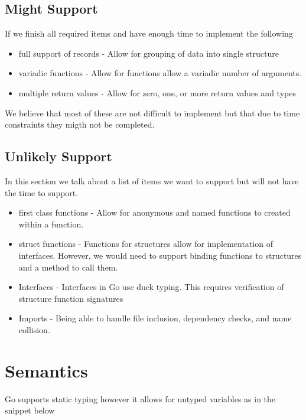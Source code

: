 \documentclass{article}
\begin{document}
\subsection{Might Support}

If we finish all required items and have enough time to implement the following 

\begin{itemize}
    \item full support of records   - Allow for grouping of data into single structure
    \item variadic functions        - Allow for functions allow a variadic number of arguments.
    \item multiple return values    - Allow for zero, one, or more return values and types
\end{itemize}
 
We believe that most of these are not difficult to implement but that due to time constraints they migth not be completed.

\subsection{Unlikely Support} 

In this section we talk about a list of items we want to support but will not have the time to support.

\begin{itemize}
    \item first class functions     - Allow for anonymous and named functions to created within a function.
    \item struct functions  - Functions for structures allow for implementation of interfaces.  However, we would need to support binding functions to structures and a method to call them.
    \item Interfaces        - Interfaces in Go use duck typing. This requires verification of structure function signatures  
    \item Imports           - Being able to handle file inclusion, dependency checks, and name collision. 
\end{itemize}

\section{Semantics}

Go supports static typing however it allows for untyped variables as in the snippet below
\end{document}
